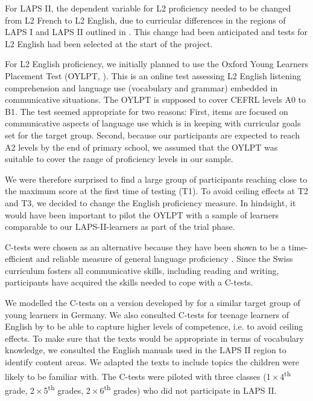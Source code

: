 \documentclass[output=paper]{langsci/langscibook}
\begin{document}
For LAPS II, the dependent variable for L2 proficiency needed to be changed from L2 French to L2 English, due to curricular differences in the regions of LAPS I and LAPS II outlined in . This change had been anticipated and tests for L2 English had been selected at the start of the project.

For L2 English proficiency, we initially planned to use the Oxford Young Learners Placement Test (OYLPT, \citealt{Testing2013}). This is an online test assessing L2 English listening comprehension and language use (vocabulary and grammar) embedded in communicative situations. The OYLPT is supposed to cover CEFRL levels A0 to B1. The test seemed appropriate for two reasons: First, items are focused on communicative aspects of language use which is in keeping with curricular goals set for the target group. Second, because our participants are expected to reach A2 levels by the end of primary school, we assumed that the OYLPT was suitable to cover the range of proficiency levels in our sample. 

We were therefore surprised to find a large group of participants reaching close to the maximum score at the first time of testing (T1). To avoid ceiling effects at T2 and T3, we decided to change the English proficiency measure. In hindsight, it would have been important to pilot the OYLPT with a sample of learners comparable to our LAPS-II-learners as part of the trial phase. 

C-tests were chosen as an alternative because they have been shown to be a time-efficient and reliable measure of general language proficiency \citep{EckesGrotjahn2006}. Since the Swiss curriculum fosters all communicative skills, including reading and writing, participants have acquired the skills needed to cope with a C-tests. 

We modelled the C-tests on a version developed by \citet{WildenPorsch2017} for a similar target group of young learners in Germany. We also consulted C-tests for teenage learners of English by \citet{BabaiiShahri2010} to be able to capture higher levels of competence, i.e. to avoid ceiling effects. To make sure that the texts would be appropriate in terms of vocabulary knowledge, we consulted the English manuals used in the LAPS II region to identify content areas. We adapted the texts to include topics the children were likely to be familiar with. The C-tests were piloted with three classes (1\,×\,4\textsuperscript{th} grade, 2\,×\,5\textsuperscript{th} grades, 2\,×\,6\textsuperscript{th} grades) who did not participate in LAPS II. 
\end{document}
